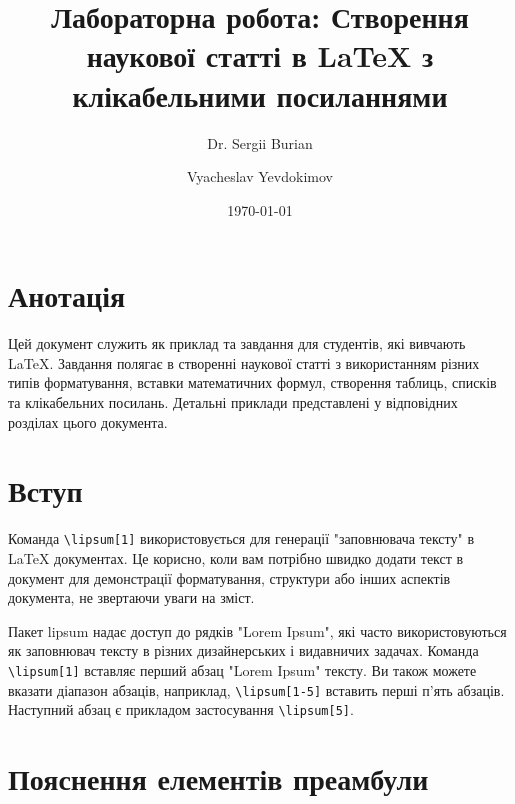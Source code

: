 \documentclass[14pt,a4paper,twoside]{article}
\begin{document}
	\onehalfspacing  %
	\title{Лабораторна робота: Створення наукової статті в LaTeX з клікабельними посиланнями}
	\author{Dr. Sergii Burian \and Vyacheslav Yevdokimov}
	\date{\today}
	\maketitle
	\thispagestyle{plain}
	
	\newpage  %
	\thispagestyle{empty}  %
	\mbox{}  %
	
	\newpage  %
	
	\tableofcontents  %
	
	\newpage  %
	
	\section*{Анотація}
	Цей документ служить як приклад та завдання для студентів, які вивчають LaTeX. Завдання полягає в створенні наукової статті з використанням різних типів форматування, вставки математичних формул, створення таблиць, списків та клікабельних посилань. Детальні приклади представлені у відповідних розділах цього документа.
	
	\newpage
	
	\section{Вступ}
	Команда \texttt{\textbackslash lipsum[1]} використовується для генерації "заповнювача тексту" в LaTeX документах. Це корисно, коли вам потрібно швидко додати текст в документ для демонстрації форматування, структури або інших аспектів документа, не звертаючи уваги на зміст.
	
	Пакет lipsum надає доступ до рядків "Lorem Ipsum", які часто використовуються як заповнювач тексту в різних дизайнерських і видавничих задачах. Команда \texttt{\textbackslash lipsum[1]} вставляє перший абзац "Lorem Ipsum" тексту. Ви також можете вказати діапазон абзаців, наприклад, \texttt{\textbackslash lipsum[1-5]} вставить перші п'ять абзаців. Наступний абзац є прикладом застосування  \texttt{\textbackslash lipsum[5]}.
	
	\lipsum[4]
	
	\section{Пояснення елементів преамбули}
	
\end{document}
